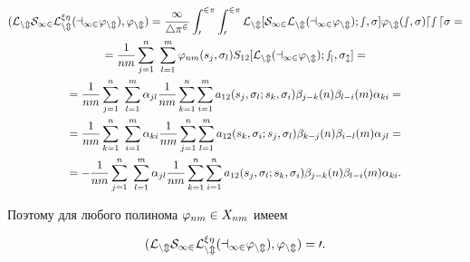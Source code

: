 \begin{gather*}


(\rL_{nm}S_{12}\rL_{nm}^{\xi\eta}(a_{12}\vp_{nm}),\vp_{nm}) = 


\frac{1}{4\pi^2}\int_0^{2\pi}\int_0^{2\pi} \rL_{nm}[S_{12}\rL_{nm}(a_{12}


\vp_{nm});s,\si]\vp_{nm}(s,\si)ds\, d\si = \\


%


=\frac{1}{nm}\sum_{j=1}^n\ \sum_{l=1}^m \vp_{nm}(s_j,\si_l)S_{12}


[\rL_{nm}(a_{12}\vp_{nm});s_j,\si_l] = \\


%


=


\frac{1}{nm}\sum_{j=1}^n\ \sum_{l=1}^m \alpha_{jl}


\frac{1}{nm}\suml_{k=1}^n\sum_{i=1}^m


a_{12}(s_j,\si_l;s_k,\si_i)\beta_{j-k}(n)\beta_{l-i}(m)\alpha_{ki} = \\


%


=\frac{1}{nm}\sum_{k=1}^n\ \sum_{i=1}^m \alpha_{ki}\frac{1}{nm}


\suml_{j=1}^n\sum_{l=1}^m


a_{12}(s_k,\si_i;s_j,\si_l)\beta_{k-j}(n)\beta_{i-l}(m)\alpha_{jl} = \\


%








%


=-\frac{1}{nm}\sum_{j=1}^n\ \sum_{l=1}^m \alpha_{jl}\frac{1}{nm}


\suml_{k=1}^n\sum_{i=1}^n


a_{12}(s_j,\si_l;s_k,\si_i)\beta_{j-k}(n)\beta_{l-i}(m)\alpha_{ki}.


\end{gather*}


Поэтому для любого полинома $\varphi_{nm}\in X_{nm}$ имеем 


\begin{equation}


(\rL_{nm}S_{12}\rL_{nm}^{\xi\eta}(a_{12}\vp_{nm}),\vp_{nm})=0.


\end{equation}





